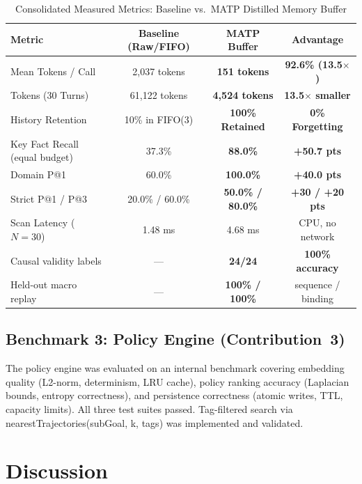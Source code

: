 \documentclass[lettersize,journal]{IEEEtran}
\begin{document}
\begin{table}[!t]
\caption{Consolidated Measured Metrics: Baseline vs.\ MATP Distilled Memory Buffer\label{tab:metrics_summary}}
\centering
{\footnotesize
\begin{tabular}{lccc}
\toprule
\textbf{Metric} & \textbf{Baseline (Raw/FIFO)} & \textbf{MATP Buffer} & \textbf{Advantage} \\
\midrule
Mean Tokens / Call      & 2,037 tokens & \textbf{151 tokens} & \textbf{92.6\% (13.5$\times$)} \\
Tokens (30 Turns)       & 61,122 tokens & \textbf{4,524 tokens} & \textbf{13.5$\times$ smaller} \\
History Retention       & 10\% in FIFO(3) & \textbf{100\% Retained} & \textbf{0\% Forgetting} \\
Key Fact Recall (equal budget) & 37.3\% & \textbf{88.0\%} & \textbf{+50.7 pts} \\
Domain P@1              & 60.0\% & \textbf{100.0\%} & \textbf{+40.0 pts} \\
Strict P@1 / P@3        & 20.0\% / 60.0\% & \textbf{50.0\% / 80.0\%} & \textbf{+30 / +20 pts} \\
Scan Latency ($N=30$)   & 1.48 ms & 4.68 ms & CPU, no network \\
Causal validity labels  & --- & \textbf{24/24} & \textbf{100\% accuracy} \\
Held-out macro replay   & --- & \textbf{100\% / 100\%} & sequence / binding \\
\bottomrule
\end{tabular}
}
\end{table}

\subsection{Benchmark 3: Policy Engine (Contribution~3)}

The policy engine was evaluated on an internal benchmark covering embedding quality (L2-norm, determinism, LRU cache), policy ranking accuracy (Laplacian bounds, entropy correctness), and persistence correctness (atomic writes, TTL, capacity limits). All three test suites passed. Tag-filtered search via nearestTrajectories(subGoal, k, tags) was implemented and validated.

\section{Discussion}
\end{document}
